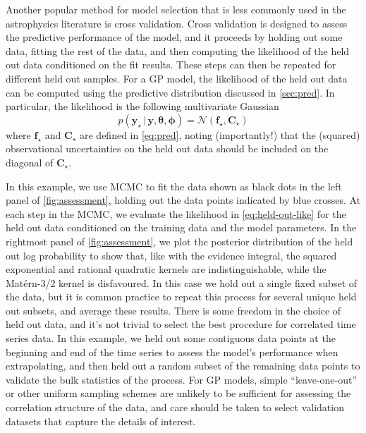 \documentclass[letterpaper]{ar-1col}
\newcommand{\ydata}{\ensuremath{\boldsymbol{y}}}
\newcommand{\hyperparams}{\ensuremath{\boldsymbol{\phi}}}
\newcommand{\meanparams}{\ensuremath{\boldsymbol{\theta}}}
\begin{document}
Another popular method for model selection that is less commonly used in the astrophysics literature is cross validation.
Cross validation is designed to assess the predictive performance of the model, and it proceeds by holding out some data, fitting the rest of the data, and then computing the likelihood of the held out data conditioned on the fit results.
These steps can then be repeated for different held out samples.
For a GP model, the likelihood of the held out data can be computed using the predictive distribution discussed in \autoref{sec:pred}.
In particular, the likelihood is the following multivariate Gaussian
\begin{equation}\label{eq:held-out-like}
  p(\ydata_\star\,|\,\ydata,\meanparams, \hyperparams) = \mathcal{N}(\boldsymbol{f}_\star,\boldsymbol{C}_\star)
\end{equation}
where $\boldsymbol{f}_\star$ and $\boldsymbol{C}_\star$ are defined in \autoref{eq:pred}, noting (importantly!) that the (squared) observational uncertainties on the held out data should be included on the diagonal of $\boldsymbol{C}_\star$.

In this example, we use MCMC to fit the data shown as black dots in the left panel of \autoref{fig:assessment}, holding out the data points indicated by blue crosses.
At each step in the MCMC, we evaluate the likelihood in \autoref{eq:held-out-like} for the held out data conditioned on the training data and the model parameters.
In the rightmost panel of \autoref{fig:assessment}, we plot the posterior distribution of the held out log probability to show that, like with the evidence integral, the squared exponential and rational quadratic kernels are indistinguishable, while the Mat\'ern-3/2 kernel is disfavoured.
In this case we hold out a single fixed subset of the data, but it is common practice to repeat this process for several unique held out subsets, and average these results.
There is some freedom in the choice of held out data, and it's not trivial to select the best procedure for correlated time series data.
In this example, we held out some contiguous data points at the beginning and end of the time series to assess the model's performance when extrapolating, and then held out a random subset of the remaining data points to validate the bulk statistics of the process.
For GP models, simple ``leave-one-out'' or other uniform sampling schemes are unlikely to be sufficient for assessing the correlation structure of the data, and care should be taken to select validation datasets that capture the details of interest.
\end{document}
